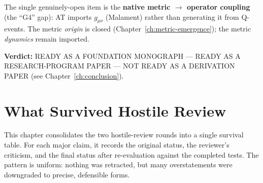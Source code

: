 \documentclass[10pt,twoside,openany]{book}
\begin{document}
The single genuinely-open item is the \textbf{native metric $\to$ operator coupling} (the
``G4'' gap): AT imports $g_{\mu\nu}$ (Malament) rather than generating it from Q-events.
The metric \emph{origin} is closed (Chapter~\ref{ch:metric-emergence}); the metric
\emph{dynamics} remain imported.

\textbf{Verdict:} READY AS A FOUNDATION MONOGRAPH --- READY AS A RESEARCH-PROGRAM PAPER
--- NOT READY AS A DERIVATION PAPER (see Chapter~\ref{ch:conclusion}).


\chapter{What Survived Hostile Review}
\label{ch:survived}

This chapter consolidates the two hostile-review rounds into a single survival table. For
each major claim, it records the original status, the reviewer's criticism, and the final
status after re-evaluation against the completed tests. The pattern is uniform: nothing
was retracted, but many overstatements were downgraded to precise, defensible forms.
\end{document}
